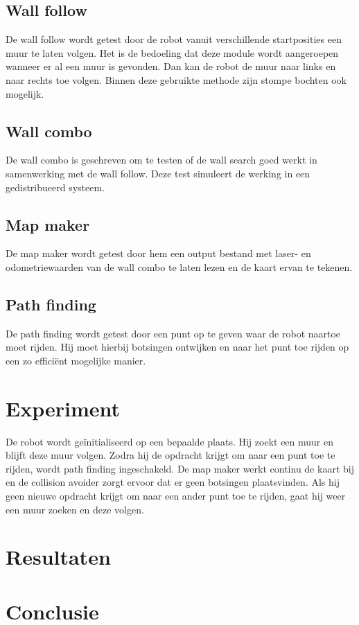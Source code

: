 \documentclass[a4paper,10pt]{article}
\begin{document}
\subsection{Wall follow}
De wall follow wordt getest door de robot vanuit verschillende startposities een muur te laten volgen. Het is de bedoeling dat deze module wordt aangeroepen wanneer er al een muur is gevonden. Dan kan de robot de muur naar links en naar rechts toe volgen. Binnen deze gebruikte methode zijn stompe bochten ook mogelijk.

\subsection{Wall combo}
De wall combo is geschreven om te testen of de wall search goed werkt in samenwerking met de wall follow. Deze test simuleert
de werking in een gedistribueerd systeem.

\subsection{Map maker}
De map maker wordt getest door hem een output bestand met laser- en odometriewaarden van de wall combo te laten lezen en de kaart ervan te tekenen.

\subsection{Path finding}
De path finding wordt getest door een punt op te geven waar de robot naartoe moet rijden. Hij moet hierbij botsingen ontwijken en naar het punt toe rijden op een zo effici\"{e}nt mogelijke manier.

\section{Experiment}
De robot wordt ge\"{i}nitialiseerd op een bepaalde plaats. Hij zoekt een muur en blijft deze muur volgen. Zodra hij de opdracht krijgt om naar een punt toe te rijden, wordt path finding ingeschakeld. De map maker werkt continu de kaart bij en de collision avoider zorgt ervoor dat er geen botsingen plaatsvinden. Als hij geen nieuwe opdracht krijgt om naar een ander punt toe te rijden, gaat hij weer een muur zoeken en deze volgen.

\section{Resultaten}
\section{Conclusie}
\end{document}
